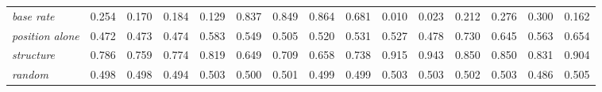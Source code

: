 \begin{table}[t]
\begin{tabular}{@{}lrrrrrrrrrrrrrr@{}}
\midrule
\emph{base rate} & 0.254 & 0.170 & 0.184 & 0.129 & 0.837 & 0.849 & 0.864 & 0.681 & 0.010 & 0.023 & 0.212 & 0.276 & 0.300 & 0.162 \\
\emph{position alone} & 0.472 & 0.473 & 0.474 & 0.583 & 0.549 & 0.505 & 0.520 & 0.531 & 0.527 & 0.478 & 0.730 & 0.645 & 0.563 & 0.654 \\
\emph{structure} & 0.786 & 0.759 & 0.774 & 0.819 & 0.649 & 0.709 & 0.658 & 0.738 & 0.915 & 0.943 & 0.850 & 0.850 & 0.831 & 0.904 \\
\emph{random} & 0.498 & 0.498 & 0.494 & 0.503 & 0.500 & 0.501 & 0.499 & 0.499 & 0.503 & 0.503 & 0.502 & 0.503 & 0.486 & 0.505 \\
\bottomrule
\end{tabular}
\end{table}
